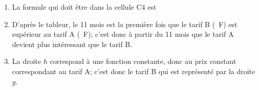 %

\begin{enumerate}
\item La formule qui doit être dans la cellule C4 est

\item D'après le tableur, le 11\ieme{} mois est la première fois que le tarif B (~F) est supérieur au tarif A (~F); c'est donc à partir du 11\ieme{} mois que le tarif A devient plus intéressant que le tarif B. 

\item La droite $h$ correspond à une fonction constante, donc au prix constant correspondant au tarif A; c'est donc le tarif B qui est représenté par la droite $g$.

\end{enumerate}


\vspace{0,5cm}

